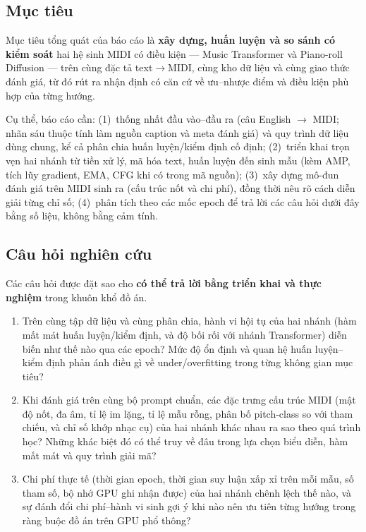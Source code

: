 \subsection{Mục tiêu}

Mục tiêu tổng quát của báo cáo là \textbf{xây dựng, huấn luyện và so sánh có kiểm soát} hai hệ sinh MIDI có điều kiện --- Music Transformer và Piano-roll Diffusion --- trên cùng đặc tả text$\rightarrow$MIDI, cùng kho dữ liệu và cùng giao thức đánh giá, từ đó rút ra nhận định có căn cứ về ưu--nhược điểm và điều kiện phù hợp của từng hướng.

Cụ thể, báo cáo cần: (1)~thống nhất đầu vào--đầu ra (câu English $\rightarrow$ MIDI; nhãn sáu thuộc tính làm nguồn caption và meta đánh giá) và quy trình dữ liệu dùng chung, kể cả phân chia huấn luyện/kiểm định cố định; (2)~triển khai trọn vẹn hai nhánh từ tiền xử lý, mã hóa text, huấn luyện đến sinh mẫu (kèm AMP, tích lũy gradient, EMA, CFG khi có trong mã nguồn); (3)~xây dựng mô-đun đánh giá trên MIDI sinh ra (cấu trúc nốt và chi phí), đồng thời nêu rõ cách diễn giải từng chỉ số; (4)~phân tích theo các mốc epoch để trả lời các câu hỏi dưới đây bằng số liệu, không bằng cảm tính.

\subsection{Câu hỏi nghiên cứu}

Các câu hỏi được đặt sao cho \textbf{có thể trả lời bằng triển khai và thực nghiệm} trong khuôn khổ đồ án.

\begin{enumerate}
    \item[\textbf{RQ1.}]
    Trên cùng tập dữ liệu và cùng phân chia, hành vi hội tụ của hai nhánh (hàm mất mát huấn luyện/kiểm định, và độ bối rối với nhánh Transformer) diễn biến như thế nào qua các epoch? Mức độ ổn định và quan hệ huấn luyện--kiểm định phản ánh điều gì về under/overfitting trong từng không gian mục tiêu?

    \item[\textbf{RQ2.}]
    Khi đánh giá trên cùng bộ prompt chuẩn, các đặc trưng cấu trúc MIDI (mật độ nốt, đa âm, tỉ lệ im lặng, tỉ lệ mẫu rỗng, phân bố pitch-class so với tham chiếu, và chỉ số khớp nhạc cụ) của hai nhánh khác nhau ra sao theo quá trình học? Những khác biệt đó có thể truy về đâu trong lựa chọn biểu diễn, hàm mất mát và quy trình giải mã?

    \item[\textbf{RQ3.}]
    Chi phí thực tế (thời gian epoch, thời gian suy luận xấp xỉ trên mỗi mẫu, số tham số, bộ nhớ GPU ghi nhận được) của hai nhánh chênh lệch thế nào, và sự đánh đổi chi phí--hành vi sinh gợi ý khi nào nên ưu tiên từng hướng trong ràng buộc đồ án trên GPU phổ thông?
\end{enumerate}


